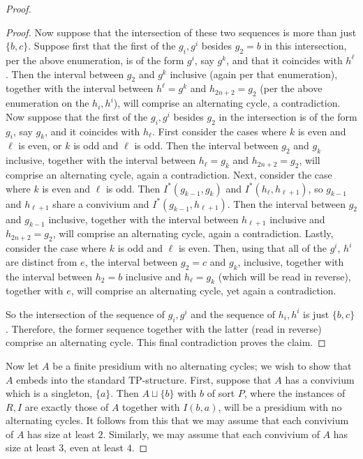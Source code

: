 \documentclass{amsart}
\theoremstyle{definition}
\theoremstyle{remark}
\numberwithin{equation}{section}
\begin{document}
\begin{proof}
\begin{proof}
Now suppose that the intersection of these two sequences is more than just $\{b, c\}$. Suppose first that the first of the $g_i, g^i$ besides $g_2=b$ in this intersection, per the above enumeration, is of the form $g^i$, say $g^k$, and that it coincides with $h^{\ell}$. Then the interval between $g_2$ and $g^k$ inclusive (again per that enumeration), together with the interval between $h^{\ell} = g^k$ and $h_{2n+2} = g_2$ (per the above enumeration on the $h_i, h^i$), will comprise an  alternating cycle, a contradiction. Now suppose that the first of the $g_i, g^i$ besides $g_2$ in the intersection is of the form $g_i$, say $g_k$, and it coincides with $h_\ell$. First consider the cases where $k$ is even and $\ell$ is even, or $k$ is odd and $\ell$ is odd. Then the interval between $g_2$ and $g_k$ inclusive, together with the interval between $h_{\ell} = g_k$ and $h_{2n+2} = g_2$, will comprise an alternating cycle, again a contradiction. Next, consider the case where $k$ is even and $\ell$ is odd. Then $I^{*}(g_{k-1}, g_{k})$ and $I^{*}(h_{\ell}, h_{\ell+1})$, so $g_{k-1}$ and $h_{\ell+1}$ share a convivium and $I^{*}(g_{k-1}, h_{\ell+1})$. Then the interval between $g_2$ and $g_{k-1}$ inclusive, together with the interval between $h_{\ell+1}$ inclusive and  $h_{2n+2} = g_2$, will comprise an alternating cycle, again a contradiction. Lastly, consider the case where $k$ is odd and $\ell$ is even. Then, using that all of the $g^i$, $h^i$ are distinct from $e$, the interval between $g_{2}=c$ and $g_{k}$, inclusive, together with the interval between $h_{2}=b$ inclusive and $h_{\ell} = g_{k}$ (which will be read in reverse), together with $e$, will comprise an alternating cycle, yet again a contradiction.

So the intersection of the sequence of $g_i, g^i$ and the sequence of $h_i, h^i$ is just $\{b, c\}$. Therefore, the former sequence together with the latter (read in reverse) comprise an alternating cycle. This final contradiction proves the claim.




\end{proof}
Now let $A$ be a finite presidium with no alternating cycles; we wish to show that $A$ embeds into the standard $\mathrm{TP}$-structure. First, suppose that $A$ has a convivium which is a singleton, $\{a\}$. Then $A \sqcup \{b\}$ with $b$ of sort $P$, where the instances of $R, I$ are exactly those of $A$ together with $I(b, a)$, will be a presidium with no alternating cycles. It follows from this that we may assume that each convivium of $A$ has size at least $2$. Similarly, we may assume that each convivium of $A$ has size at least $3$, even at least $4$.


\end{proof}
\end{document}
